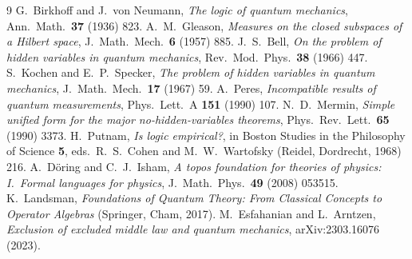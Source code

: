 \documentclass[11pt,a4paper]{article}
\theoremstyle{plain}
\theoremstyle{definition}
\theoremstyle{remark}
\begin{document}
\begin{thebibliography}{9}\small
{} G.~Birkhoff and J.~von Neumann, \emph{The logic of quantum mechanics}, Ann.\ Math.\ \textbf{37} (1936) 823.
 A.~M.~Gleason, \emph{Measures on the closed subspaces of a Hilbert space}, J.\ Math.\ Mech.\ \textbf{6} (1957) 885.
 J.~S.~Bell, \emph{On the problem of hidden variables in quantum mechanics}, Rev.\ Mod.\ Phys.\ \textbf{38} (1966) 447.
 S.~Kochen and E.~P.~Specker, \emph{The problem of hidden variables in quantum mechanics}, J.\ Math.\ Mech.\ \textbf{17} (1967) 59.
 A.~Peres, \emph{Incompatible results of quantum measurements}, Phys.\ Lett.\ A \textbf{151} (1990) 107.
 N.~D.~Mermin, \emph{Simple unified form for the major no-hidden-variables theorems}, Phys.\ Rev.\ Lett.\ \textbf{65} (1990) 3373.
 H.~Putnam, \emph{Is logic empirical?}, in Boston Studies in the Philosophy of Science \textbf{5}, eds.\ R.~S.~Cohen and M.~W.~Wartofsky (Reidel, Dordrecht, 1968) 216.
 A.~D\"oring and C.~J.~Isham, \emph{A topos foundation for theories of physics: I.\ Formal languages for physics}, J.\ Math.\ Phys.\ \textbf{49} (2008) 053515.
 K.~Landsman, \emph{Foundations of Quantum Theory: From Classical Concepts to Operator Algebras} (Springer, Cham, 2017).
 M.~Esfahanian and L.~Arntzen, \emph{Exclusion of excluded middle law and quantum mechanics}, arXiv:2303.16076 (2023).
\end{thebibliography}
\end{document}
